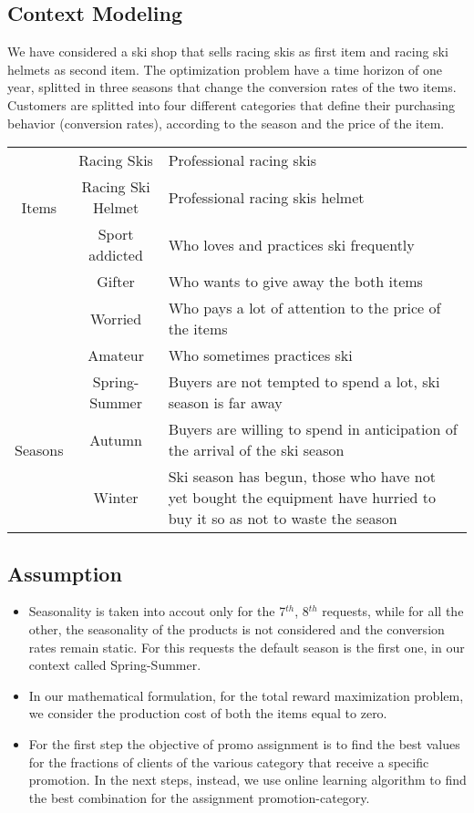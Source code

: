 \subsection*{Context Modeling}
We have considered a ski shop that sells racing skis as first item and racing ski helmets as second item. The optimization problem have a time horizon of one year, splitted in three seasons that change the conversion rates of the two items. Customers are splitted into four different categories that define their purchasing behavior (conversion rates), according to the season and the price of the item.

\begin{center}
	\begin{tabular}{ |c|c|p{9cm}| } 
	\hline
	\multirow{3}{4em}{Items} & Racing Skis & Professional racing skis \\ 
	& Racing Ski Helmet &  Professional racing skis helmet\\ 
	\hline
	\multirow{3}{4em}{Customer categories} & Sport addicted & Who loves and practices ski frequently\\ 
	& Gifter &  Who wants to give away the both items\\
	& Worried &  Who pays a lot of attention to the price of the items\\ 
	& Amateur &  Who sometimes practices ski\\ 
	\hline
	\multirow{3}{4em}{Seasons} & Spring-Summer & Buyers are not tempted to spend a lot, ski season is far away\\ 
	& Autumn & Buyers are willing to spend in anticipation of the arrival of the ski season \\
	& Winter &  Ski season has begun, those who have not yet bought the equipment have hurried to buy it so as not to waste the season\\  
	\hline
	\end{tabular}
	\end{center}

\subsection*{Assumption}
\begin{itemize}
		\item Seasonality is taken into accout only for the 7$^{th}$, 8$^{th}$ requests, while for all the other, the seasonality of the products is not considered and the conversion rates remain static. For this requests the default season is the first one, in our context called Spring-Summer.  
		\item In our mathematical formulation, for the total reward maximization problem, we consider the production cost of both the items equal to zero.
		\item For the first step the objective of promo assignment is to find the best values for the fractions of clients of the various category that receive a specific promotion. In the next steps, instead, we use online learning algorithm to find the best combination for the assignment promotion-category.
	\end{itemize}